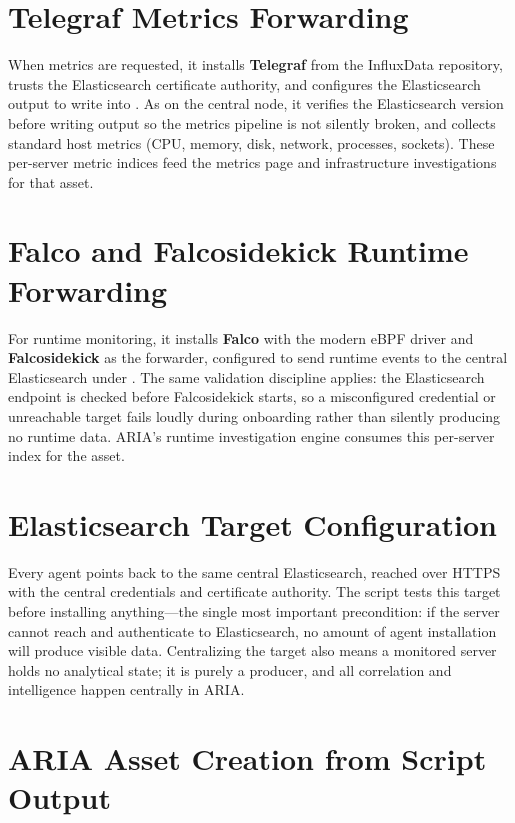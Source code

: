 \section{Telegraf Metrics Forwarding}

When metrics are requested, it installs \textbf{Telegraf} from the InfluxData repository, trusts the Elasticsearch certificate authority, and configures the Elasticsearch output to write into . As on the central node, it verifies the Elasticsearch version before writing output so the metrics pipeline is not silently broken, and collects standard host metrics (CPU, memory, disk, network, processes, sockets). These per-server metric indices feed the metrics page and infrastructure investigations for that asset.

\section{Falco and Falcosidekick Runtime Forwarding}

For runtime monitoring, it installs \textbf{Falco} with the modern eBPF driver and \textbf{Falcosidekick} as the forwarder, configured to send runtime events to the central Elasticsearch under . The same validation discipline applies: the Elasticsearch endpoint is checked before Falcosidekick starts, so a misconfigured credential or unreachable target fails loudly during onboarding rather than silently producing no runtime data. ARIA's runtime investigation engine consumes this per-server index for the asset.

\section{Elasticsearch Target Configuration}

Every agent points back to the same central Elasticsearch, reached over HTTPS with the central credentials and certificate authority. The script tests this target before installing anything---the single most important precondition: if the server cannot reach and authenticate to Elasticsearch, no amount of agent installation will produce visible data. Centralizing the target also means a monitored server holds no analytical state; it is purely a producer, and all correlation and intelligence happen centrally in ARIA.

\section{ARIA Asset Creation from Script Output}

